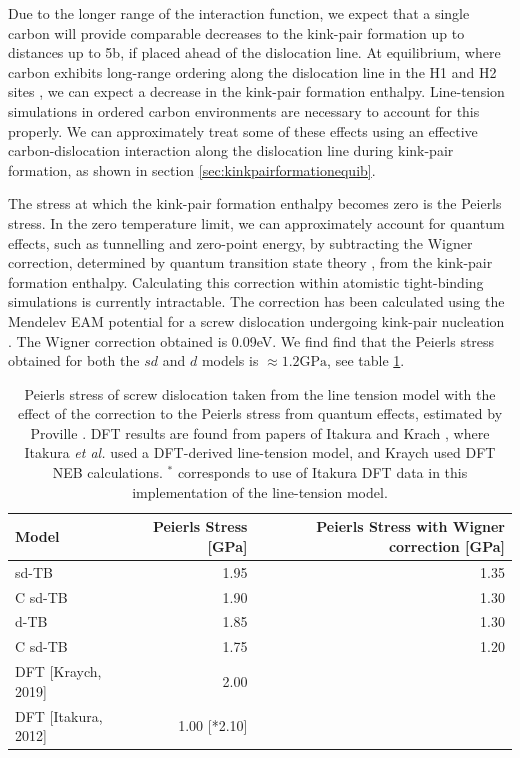 \documentclass[a4paper,11pt]{article}
\numberwithin{equation}{chapter}
\numberwithin{listing}{chapter}
\begin{document}
Due to the longer range of the interaction function, we expect that a single carbon
will provide comparable decreases to the kink-pair formation up to distances up to 5b,
if placed ahead of the dislocation line. At equilibrium, where carbon exhibits
long-range ordering along the dislocation line in the H1 and H2 sites \cite{Luthi2019},
we can expect a decrease in the kink-pair formation enthalpy. Line-tension simulations in
ordered carbon environments are necessary to account for this properly. We can approximately
treat some of these effects using an effective carbon-dislocation interaction
along the dislocation line during kink-pair formation, as shown in section
\ref{sec:kinkpairformationequib}.



The stress at which the kink-pair formation enthalpy becomes zero is the Peierls
stress. In the zero temperature limit, we can approximately account for quantum
effects, such as tunnelling and zero-point energy, by subtracting the Wigner
correction, determined by quantum transition state theory
\cite{Proville2012,Henkelman2006}, from the kink-pair formation enthalpy. Calculating
this correction within atomistic tight-binding simulations is currently
intractable. The correction has been calculated using the Mendelev EAM potential
\cite{Mendelev2003} for a screw dislocation undergoing kink-pair nucleation
\cite{Proville2012}. The Wigner correction obtained is 0.09eV. We find find that the
Peierls stress obtained for both the \(sd\) and \(d\) models is \(\approx1.2\text{GPa}\), see table
\ref{wignercorrection}.


\begin{table}[htbp]
\caption{Peierls stress of screw dislocation taken from the line tension model with the effect of the correction to the Peierls stress from quantum effects, estimated by Proville \cite{Proville2012}. DFT results are found from papers of Itakura and Krach \cite{Itakura2012,Kraych2019}, where Itakura \emph{et al.} used a DFT-derived line-tension model, and Kraych used DFT NEB calculations. \(^{*}\) corresponds to use of Itakura DFT data in this implementation of the line-tension model.  \label{wignercorrection}}
\centering
\begin{tabular}{lrr}
\toprule
Model & Peierls Stress [GPa] & Peierls Stress with Wigner correction [GPa]\\
\midrule
sd-TB & 1.95 & 1.35\\
C sd-TB & 1.90 & 1.30\\
\midrule
d-TB & 1.85 & 1.30\\
C sd-TB & 1.75 & 1.20\\
\midrule
DFT [Kraych, 2019] & 2.00 & \\
DFT [Itakura, 2012] & 1.00 [*2.10] & \\
\bottomrule
\end{tabular}
\end{table}
\end{document}
